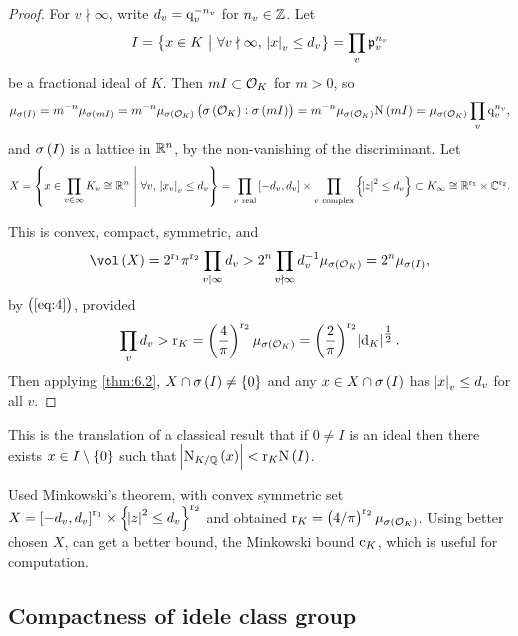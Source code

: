 \begin{proof}
For $ v \nmid \infty $, write $ d_v = \mathrm{q}_v^{-n_v} $ for $ n_v \in \mathbb{Z} $. Let
$$ I = \cbr{x \in K \st \forall v \nmid \infty, \ \abs{x}_v \le d_v} = \prod_v \ppp_v^{n_v} $$
be a fractional ideal of $ K $. Then $ mI \subset \mathcal{O}_K $ for $ m > 0 $, so
\begin{equation}
\label{eq:4}
\mu_{\sigma\br{I}} = m^{-n}\mu_{\sigma\br{mI}} = m^{-n}\mu_{\sigma\br{\OOO_K}}\br{\sigma\br{\OOO_K} : \sigma\br{mI}} = m^{-n}\mu_{\sigma\br{\OOO_K}}\N\br{mI} = \mu_{\sigma\br{\OOO_K}}\prod_v \q_v^{n_v},
\end{equation}
and $ \sigma\br{I} $ is a lattice in $ \mathbb{R}^n $, by the non-vanishing of the discriminant. Let
$$ X = \cbr{x \in \prod_{v \in \infty} K_v \cong \RR^n \st \forall v, \ \abs{x_v}_v \le d_v} = \prod_{v \ \text{real}} \sbr{-d_v, d_v} \times \prod_{v \ \text{complex}} \cbr{\abs{z}^2 \le d_v} \subset K_\infty \cong \RR^{\r_1} \times \CC^{\r_2}. $$

\pagebreak

This is convex, compact, symmetric, and
$$ \vol\br{X} = 2^{\r_1}\pi^{\r_2}\prod_{v \mid \infty} d_v > 2^n\prod_{v \nmid \infty} d_v^{-1}\mu_{\sigma\br{\OOO_K}} = 2^n\mu_{\sigma\br{I}}, $$
by $ \br{\ref{eq:4}} $, provided
$$ \prod_v d_v > \r_K = \br{\dfrac{4}{\pi}}^{\r_2}\mu_{\sigma\br{\OOO_K}} = \br{\dfrac{2}{\pi}}^{\r_2}\abs{\d_K}^{\tfrac{1}{2}}. $$
Then applying \ref{thm:6.2}, $ X \cap \sigma\br{I} \ne \cbr{0} $ and any $ x \in X \cap \sigma\br{I} $ has $ \abs{x}_v \le d_v $ for all $ v $.
\end{proof}

This is the translation of a classical result that if $ 0 \ne I $ is an ideal then there exists $ x \in I \setminus \cbr{0} $ such that $ \abs{\N_{K / \QQ}\br{x}} < \r_K\N\br{I} $.


\begin{remark*}
Used Minkowski's theorem, with convex symmetric set $ X = \sbr{-d_v, d_v}^{\r_1} \times \cbr{\abs{z}^2 \le d_v}^{\r_2} $ and obtained $ \r_K = \br{4 / \pi}^{\r_2}\mu_{\sigma\br{\OOO_K}} $. Using better chosen $ X $, can get a better bound, the Minkowski bound $ \mathrm{c}_K $, which is useful for computation.
\end{remark*}

\subsection{Compactness of idele class group}

